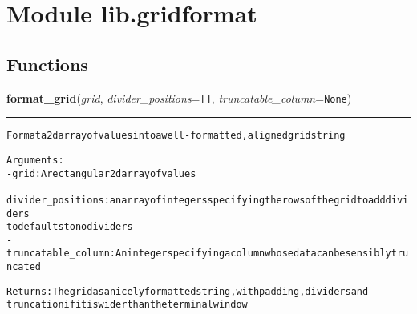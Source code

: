 %
%
%


\section{Module lib.gridformat}

    \label{lib:gridformat}


  \subsection{Functions}

    \label{lib:gridformat:format_grid}

    \vspace{0.5ex}

\hspace{.8\funcindent}\begin{boxedminipage}{\funcwidth}

    \raggedright \textbf{format\_grid}(\textit{grid}, \textit{divider\_positions}={\tt \texttt{[}\texttt{]}}, \textit{truncatable\_column}={\tt None})

    \vspace{-1.5ex}

    \rule{\textwidth}{0.5\fboxrule}
\setlength{\parskip}{2ex}
\begin{alltt}

Format a 2d array of values in to a well-formatted, aligned gridstring

Arguments:
- grid: A rectangular 2d array of values
- divider\_positions: an array of integers specifying the rows of the grid to add dividers
to defaults to no dividers
- truncatable\_column: An integer specifying a column whose data can be sensibly truncated

Returns: The grid as a nicely formatted string, with padding, dividers and
truncation if it is wider than the terminal window
\end{alltt}

\setlength{\parskip}{1ex}
    \end{boxedminipage}


